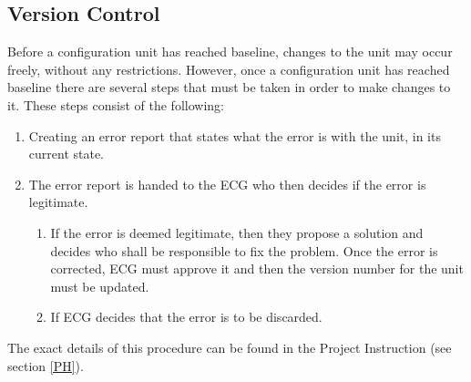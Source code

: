 \documentclass{article}
\begin{document}
    \subsection{Version Control \label{versioncontrol}}
        Before a configuration unit has reached baseline, changes to the unit
        may occur freely, without any restrictions.
        However, once a configuration unit has reached baseline there are several steps
        that must be taken in order to make changes to it.
        These steps consist of the following:
        \begin{enumerate}
            \item Creating an error report that states what the
                    error is with the unit, in its current state.
            \item The error report is handed to the ECG who then decides if the error is              legitimate.
                \begin{enumerate}
                    \item If the error is deemed legitimate, then they
                    propose a solution and
                    decides who shall be responsible to fix the problem.
                    Once the error is corrected, ECG must approve it
                    and then the version number for the unit must be updated.
                    \item If ECG decides that the error is to be discarded.
                \end{enumerate}
        \end{enumerate}
        The exact details of this procedure can be found in the Project Instruction (see section \ref{PH}).
\end{document}
